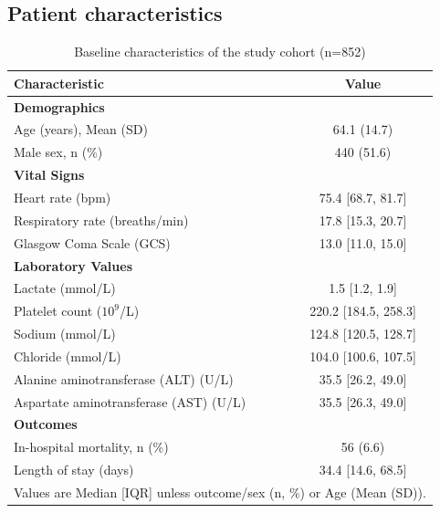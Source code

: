 \documentclass[pdflatex,sn-mathphys-num]{sn-jnl}%
\theoremstyle{thmstyleone}%
\theoremstyle{thmstyletwo}%
\theoremstyle{thmstylethree}%
\begin{document}






\begin{appendices}

\section{Patient characteristics}\label{secA1}

\begin{table}[h]
\scriptsize
\centering
\caption{Baseline characteristics of the study cohort (n=852)}
\label{tab:patient_characteristics}
\begin{tabular}{@{}lc@{}}
\toprule
\textbf{Characteristic} & \textbf{Value} \\
\midrule
\multicolumn{2}{l}{\textbf{Demographics}} \\
Age (years), Mean (SD) & 64.1 (14.7) \\
Male sex, n (\%) & 440 (51.6) \\
\multicolumn{2}{l}{\textbf{Vital Signs}} \\
Heart rate (bpm) & 75.4 [68.7, 81.7] \\
Respiratory rate (breaths/min) & 17.8 [15.3, 20.7] \\
Glasgow Coma Scale (GCS) & 13.0 [11.0, 15.0] \\
\multicolumn{2}{l}{\textbf{Laboratory Values}} \\
Lactate (mmol/L) & 1.5 [1.2, 1.9] \\
Platelet count ($10^9$/L) & 220.2 [184.5, 258.3] \\
Sodium (mmol/L) & 124.8 [120.5, 128.7] \\
Chloride (mmol/L) & 104.0 [100.6, 107.5] \\
Alanine aminotransferase (ALT) (U/L) & 35.5 [26.2, 49.0] \\
Aspartate aminotransferase (AST) (U/L) & 35.5 [26.3, 49.0] \\
\multicolumn{2}{l}{\textbf{Outcomes}} \\
In-hospital mortality, n (\%) & 56 (6.6) \\
Length of stay (days) & 34.4 [14.6, 68.5] \\
\bottomrule
\multicolumn{2}{l}{\footnotesize Values are Median [IQR] unless outcome/sex (n, \%) or Age (Mean (SD)).}
\end{tabular}
\end{table}


\end{appendices}
\end{document}
